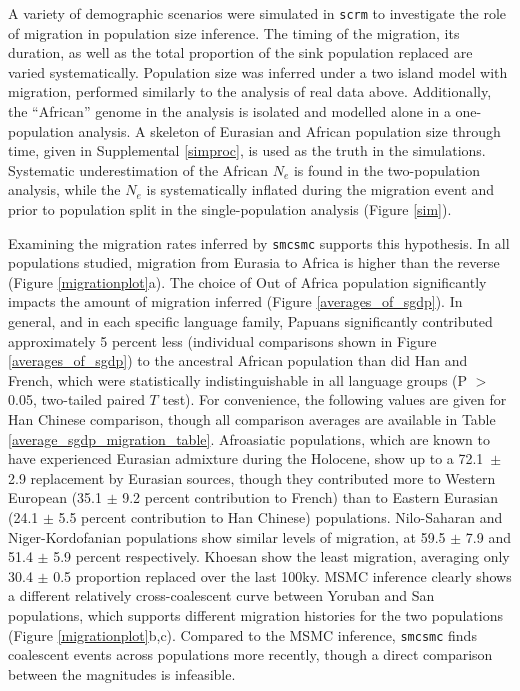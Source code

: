 \documentclass{article}
\begin{document}
A variety of demographic scenarios were simulated in {\tt scrm} to investigate the role of migration in population size inference. The timing of the migration, its duration, as well as the total proportion of the sink population replaced are varied systematically. Population size was inferred under a two island model with migration, performed similarly to the analysis of real data above. Additionally, the ``African'' genome in the analysis is isolated and modelled alone in a one-population analysis. A skeleton of Eurasian and African population size through time, given in Supplemental \ref{simproc}, is used as the truth in the simulations. Systematic underestimation of the African $N_e$ is found in the two-population analysis, while the $N_e$ is systematically inflated during the migration event and prior to population split in the single-population analysis (Figure \ref{sim}). 

Examining the migration rates inferred by {\tt smcsmc} supports this hypothesis. In all populations studied, migration from Eurasia to Africa is higher than the reverse (Figure \ref{migrationplot}a). The choice of Out of Africa population significantly impacts the amount of migration inferred (Figure \ref{averages_of_sgdp}). In general, and in each specific language family, Papuans significantly contributed approximately 5 percent less (individual comparisons shown in Figure \ref{averages_of_sgdp}) to the ancestral African population than did Han and French, which were statistically indistinguishable in all language groups (P $>$ 0.05, two-tailed paired $T$ test). For convenience, the following values are given for Han Chinese comparison, though all comparison averages are available in Table \ref{average_sgdp_migration_table}. Afroasiatic populations, which are known to have experienced Eurasian admixture during the Holocene, show up to a 72.1\ $\pm$ 2.9 replacement by Eurasian sources, though they contributed more to Western European (35.1 $\pm$ 9.2 percent contribution to French) than to Eastern Eurasian (24.1 $\pm$ 5.5 percent contribution to Han Chinese) populations. Nilo-Saharan and Niger-Kordofanian  populations show similar levels of migration, at 59.5 $\pm$ 7.9 and 51.4 $\pm$ 5.9 percent respectively. Khoesan show the least migration, averaging only 30.4 $\pm$ 0.5 proportion replaced over the last 100ky. MSMC inference clearly shows a different relatively cross-coalescent curve between Yoruban and San populations, which supports different migration histories for the two populations (Figure \ref{migrationplot}b,c). Compared to the MSMC inference, {\tt smcsmc} finds coalescent events across populations more recently, though a direct comparison between the magnitudes is infeasible. 
\end{document}
